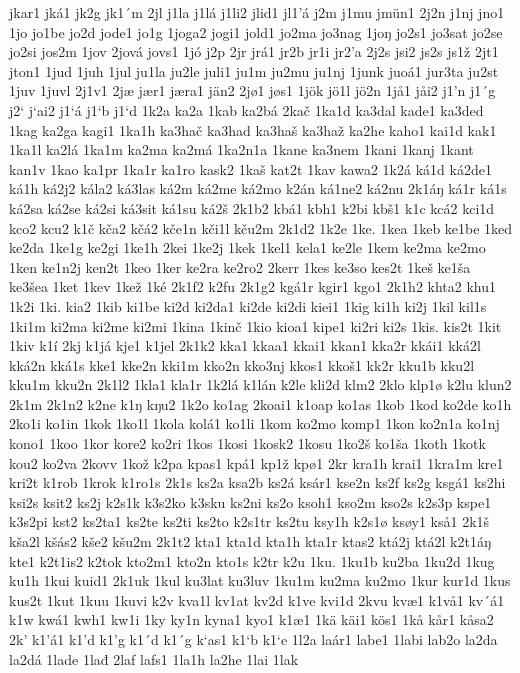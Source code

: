 jkar1
jká1
jk2g
jk1´m
2jl
j1la
j1lá
j1li2
jlid1
jl1'á
j2m
j1mu
jmün1
2j2n
j1nj
jno1
1jo
jo1be
jo2d
jode1
jo1g
1joga2
jogi1
jold1
jo2ma
jo3nag
1joŋ
jo2s1
jo3sat
jo2se
jo2si
jos2m
1jov
2jová
jovs1
1jó
j2p
2jr
jrá1
jr2b
jr1i
jr2'a
2j2s
jsi2
js2s
js1ž
2jt1
jton1
1jud
1juh
1jul
ju1la
ju2le
juli1
ju1m
ju2mu
ju1nj
1junk
juoá1
jur3ta
ju2st
1juv
1juvl
2j1v1
2jæ
jær1
jæra1
jän2
2jø1
jøs1
1jök
jö1l
jö2n
1jå1
jåi2
j1'n
j1´g
j2`
j`ai2
j1`á
j1`b
j1`d
1k2a
ka2a
1kab
ka2bá
2kač
1ka1d
ka3dal
kade1
ka3ded
1kag
ka2ga
kagi1
1ka1h
ka3hač
ka3had
ka3haš
ka3haž
ka2he
kaho1
kai1d
kak1
1ka1l
ka2lá
1ka1m
ka2ma
ka2má
1ka2n1a
1kane
ka3nem
1kani
1kanj
1kant
kan1v
1kao
ka1pr
1ka1r
ka1ro
kask2
1kaš
kat2t
1kav
kawa2
1k2á
ká1d
ká2de1
ká1h
ká2j2
kála2
ká3las
ká2m
ká2me
ká2mo
k2án
ká1ne2
ká2nu
2k1áŋ
ká1r
ká1s
ká2sa
ká2se
ká2si
ká3sit
ká1su
ká2š
2k1b2
kbá1
kbh1
k2bi
kbš1
k1c
kcá2
kci1d
kco2
kcu2
k1č
kča2
kčá2
kče1n
kči1l
kču2m
2k1d2
1k2e
1ke.
1kea
1keb
ke1be
1ked
ke2da
1ke1g
ke2gi
1ke1h
2kei
1ke2j
1kek
1kel1
kela1
ke2le
1kem
ke2ma
ke2mo
1ken
ke1n2j
ken2t
1keo
1ker
ke2ra
ke2ro2
2kerr
1kes
ke3so
kes2t
1keš
ke1ša
ke3šea
1ket
1kev
1kež
1ké
2k1f2
k2fu
2k1g2
kgá1r
kgir1
kgo1
2k1h2
khta2
khu1
1k2i
1ki.
kia2
1kib
ki1be
ki2d
ki2da1
ki2de
ki2di
kiei1
1kig
ki1h
ki2j
1kil
kil1s
1ki1m
ki2ma
ki2me
ki2mi
1kina
1kinč
1kio
kioa1
kipe1
ki2ri
ki2s
1kis.
kis2t
1kit
1kiv
k1í
2kj
k1já
kje1
k1jel
2k1k2
kka1
kkaa1
kkai1
kkan1
kka2r
kkái1
kká2l
kká2n
kká1s
kke1
kke2n
kki1m
kko2n
kko3nj
kkos1
kkoš1
kk2r
kku1b
kku2l
kku1m
kku2n
2k1l2
1kla1
kla1r
1k2lá
k1lán
k2le
kli2d
klm2
2klo
klp1ø
k2lu
klun2
2k1m
2k1n2
k2ne
k1ŋ
kŋu2
1k2o
ko1ag
2koai1
k1oap
ko1as
1kob
1kod
ko2de
ko1h
2ko1i
ko1in
1kok
1ko1l
1kola
kolá1
ko1li
1kom
ko2mo
komp1
1kon
ko2n1a
ko1nj
kono1
1koo
1kor
kore2
ko2ri
1kos
1kosi
1kosk2
1kosu
1ko2š
ko1ša
1koth
1kotk
kou2
ko2va
2kovv
1kož
k2pa
kpas1
kpá1
kp1ž
kpø1
2kr
kra1h
krai1
1kra1m
kre1
kri2t
k1rob
1krok
k1ro1s
2k1s
ks2a
ksa2b
ks2á
ksár1
kse2n
ks2f
ks2g
ksgá1
ks2hi
ksi2s
ksit2
ks2j
k2s1k
k3s2ko
k3sku
ks2ni
ks2o
ksoh1
kso2m
kso2s
k2s3p
kspe1
k3s2pi
kst2
ks2ta1
ks2te
ks2ti
ks2to
k2s1tr
ks2tu
ksy1h
k2s1ø
ksøy1
kså1
2k1š
kša2l
kšás2
kše2
kšu2m
2k1t2
kta1
kta1d
kta1h
kta1r
ktas2
ktá2j
ktá2l
k2t1áŋ
kte1
k2t1is2
k2tok
kto2m1
kto2n
kto1s
k2tr
k2u
1ku.
1ku1b
ku2ba
1ku2d
1kug
ku1h
1kui
kuid1
2k1uk
1kul
ku3lat
ku3luv
1ku1m
ku2ma
ku2mo
1kur
kur1d
1kus
kus2t
1kut
1kuu
1kuvi
k2v
kva1l
kv1at
kv2d
k1ve
kvi1d
2kvu
kvæ1
k1vå1
kv´á1
k1w
kwá1
kwh1
kw1i
1ky
ky1n
kyna1
kyo1
k1æ1
1kä
käi1
kös1
1kå
kår1
kåsa2
2k'
k1'á1
k1'd
k1'g
k1´d
k1´g
k`as1
k1`b
k1`e
1l2a
laár1
labe1
1labi
lab2o
la2da
la2dá
1lade
1lađ
2laf
lafs1
1la1h
la2he
1lai
1lak
